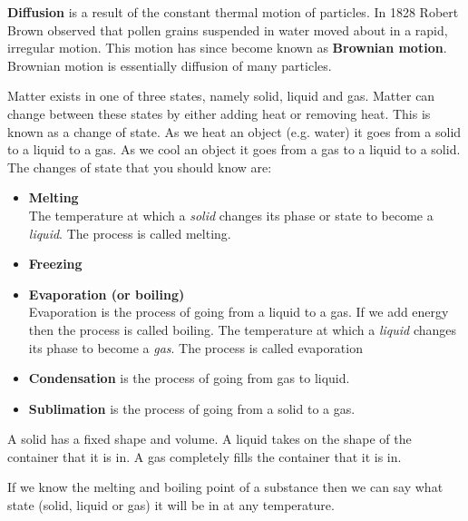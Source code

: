 \par 
\label{m38736*id10987324}\textbf{Diffusion} is a result of the constant thermal motion of particles. In 1828 Robert Brown observed that pollen grains suspended in water moved about in a rapid, irregular motion. This motion has since become known as \textbf{Brownian motion}. Brownian motion is essentially diffusion of many particles.
\par 
\label{m38736*id48327}Matter exists in one of three states, namely solid, liquid and gas. Matter can change between these states by either adding heat or removing heat. This is known as a change of state. As we heat an object (e.g. water) it goes from a solid to a liquid to a gas. As we cool an object it goes from a gas to a liquid to a solid.
The changes of state that you should know are:
\label{m38736*id02341}\begin{itemize}[noitemsep]
\item \textbf{Melting} \\ 
 { \label{m38734*meaningfhsst!!!underscore!!!id276}
The temperature at which a \textsl{solid} changes 
its phase or state to become a \textsl{liquid}. The 
process is called melting. 
 } 
\item \textbf{Freezing} \\
\item \textbf{Evaporation (or boiling)} \\
Evaporation is the process of going from a liquid to a gas. If we add energy then the process is called boiling.
 { \label{m38734*meaningfhsst!!!underscore!!!id282}
The temperature at which a \textsl{liquid} changes 
its phase to become a \textsl{gas}. The process is called evaporation} 
\item \textbf{Condensation} is the process of going from gas to liquid.
\item \textbf{Sublimation} is the process of going from a solid to a gas. \end{itemize}
A solid has a fixed shape and volume. A liquid takes on the shape of the container that it is in. A gas completely fills the container that it is in.
\par \label{m38736*eip-957}If we know the melting and boiling point of a substance then we can say what state (solid, liquid or gas) it will be in at any temperature. \par 
